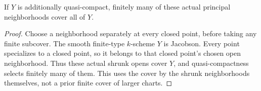 \begin{lemma}\label{lem:sc0-finite-snc-jacobian-cover}
\leanok
{}
If $Y$ is additionally quasi-compact, finitely many of these actual principal
neighborhoods cover all of $Y$.
\end{lemma}
\begin{proof}
Choose a neighborhood separately at every closed point, before taking any
finite subcover. The smooth finite-type $k$-scheme $Y$ is Jacobson. Every
point specializes to a closed point, so it belongs to that closed point's
chosen open neighborhood. Thus these actual shrunk opens cover $Y$, and
quasi-compactness selects finitely many of them. This uses the cover by the
shrunk neighborhoods themselves, not a prior finite cover of larger charts.
\end{proof}
